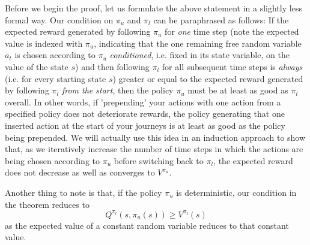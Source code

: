 \documentclass[11pt]{article} %
\begin{document}
Before we begin the proof, let us formulate the above statement in a slightly less formal way. Our condition on $\pi_u$ and $\pi_l$ can be paraphrased as follows: If the expected reward generated by following $\pi_u$ for \textit{one} time step (note the expected value is indexed with $\pi_u$, indicating that the one remaining free random variable $a_t$ is chosen according to $\pi_u$ \textit{conditioned}, i.e. fixed in its state variable, on the value of the state $s$) and then following $\pi_l$ for all subsequent time steps is \textit{always} (i.e. for every starting state $s$) greater or equal to the expected reward generated by following $\pi_l$ \textit{from the start}, then the policy $\pi_u$ must be at least as good as $\pi_l$ overall. In other words, if 'prepending' your actions with one action from a specified policy does not deteriorate rewards, the policy generating that one inserted action at the start of your journeys is at least as good as the policy being prepended. We will actually use this idea in an induction approach to show that, as we iteratively increase the number of time steps in which the actions are being chosen according to $\pi_u$ before switching back to $\pi_l$, the expected reward does not decrease as well as converges to $V^{\pi_u}$.

Another thing to note is that, if the policy $\pi_u$ is deterministic, our condition in the theorem reduces to $$Q^{\pi_l}(s,\pi_u(s)) \ge V^{\pi_l}(s)$$ as the expected value of a constant random variable reduces to that constant value.
\end{document}
